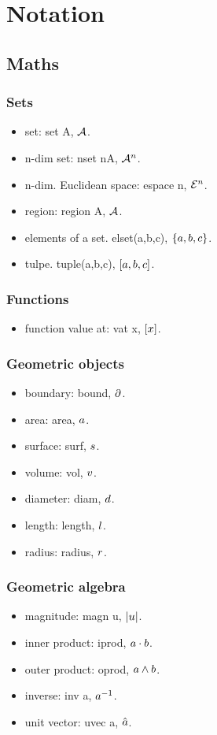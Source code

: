 \section{Notation}

\subsection{Maths}

\subsubsection{Sets}
\begin{itemize}
\item set: set A, $\set A$.
\item n-dim set: nset nA, $\nset nA$.
\item n-dim. Euclidean space: espace n, $\espace n$.
\item region: region A, $\region A$.
\item elements of a set. elset(a,b,c), $\elset{a,b,c}$.
\item tulpe. tuple(a,b,c), $\tuple{a,b,c}$.
\end{itemize}


\subsubsection{Functions}
\begin{itemize}
\item function value at: vat x, $\vat x$.
\end{itemize}


\subsubsection{Geometric objects}
\begin{itemize}
\item boundary: bound, $\bound$.
\item area: area, $\area$.
\item surface: surf, $\surf$.
\item volume: vol, $\vol$.
\item diameter: diam, $\diam$.
\item length: length, $\length$.
\item radius: radius, $\radius$.
\end{itemize}


\subsubsection{Geometric algebra}
\begin{itemize}
\item magnitude: magn u, $\magn u$.
\item inner product: iprod, $a\iprod b$.
\item outer product: oprod, $a\oprod b$.
\item inverse: inv a, $\inv a$.
\item unit vector: uvec a, $\uvec a$.
\end{itemize}


